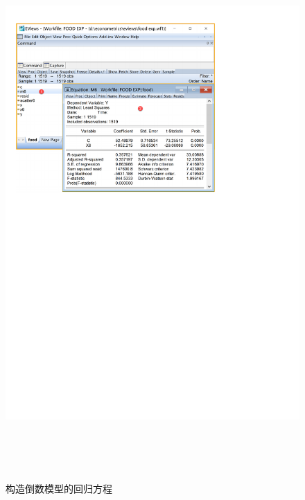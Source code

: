 \documentclass[12pt,(landscape,a4paper),(portrait,a4paper)]{article}
\begin{document}
\begin{figure}

{\centering \includegraphics[width=24.14in,height=8in]{picture/lab3-model-function/equation6} 

}

\caption{构造倒数模型的回归方程}\label{fig:equation6}
\end{figure}
\end{document}
